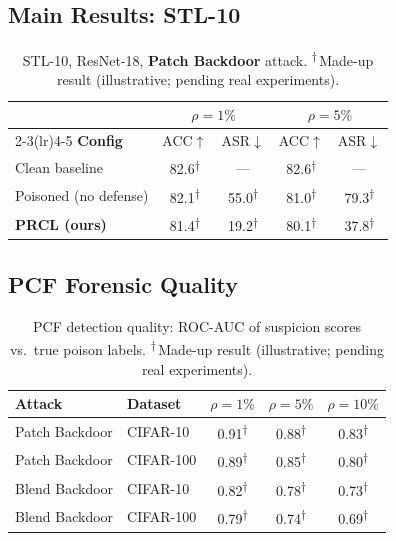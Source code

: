 \documentclass[11pt,a4paper]{article}
\newcommand{\madeupresult}[1]{\textcolor{madeup}{#1\textsuperscript{$\dagger$}}}
\newcommand{\daggernote}{\textsuperscript{$\dagger$}\,\textcolor{madeup}{Made-up result (illustrative; pending real experiments).}}
\begin{document}
\subsection{Main Results: STL-10}

\begin{table}[h]
\centering
\caption{STL-10, ResNet-18, \textbf{Patch Backdoor} attack. \daggernote}
\label{tab:stl10}
\begin{tabular}{@{}l cc cc@{}}
\toprule
& \multicolumn{2}{c}{$\rho=1\%$}
& \multicolumn{2}{c}{$\rho=5\%$} \\
\cmidrule(lr){2-3}\cmidrule(lr){4-5}
\textbf{Config}
& ACC$\uparrow$ & ASR$\downarrow$
& ACC$\uparrow$ & ASR$\downarrow$ \\
\midrule
Clean baseline
  & \madeupresult{82.6} & ---
  & \madeupresult{82.6} & --- \\
Poisoned (no defense)
  & \madeupresult{82.1} & \madeupresult{55.0}
  & \madeupresult{81.0} & \madeupresult{79.3} \\
\textbf{PRCL (ours)}
  & \madeupresult{81.4} & \madeupresult{19.2}
  & \madeupresult{80.1} & \madeupresult{37.8} \\
\bottomrule
\end{tabular}
\end{table}


\subsection{PCF Forensic Quality}

\begin{table}[h]
\centering
\caption{PCF detection quality: ROC-AUC of suspicion scores vs.\ true poison labels. \daggernote}
\label{tab:pcf_auc}
\begin{tabular}{@{}llccc@{}}
\toprule
\textbf{Attack} & \textbf{Dataset}
& $\rho=1\%$ & $\rho=5\%$ & $\rho=10\%$ \\
\midrule
Patch Backdoor & CIFAR-10
  & \madeupresult{0.91} & \madeupresult{0.88} & \madeupresult{0.83} \\
Patch Backdoor & CIFAR-100
  & \madeupresult{0.89} & \madeupresult{0.85} & \madeupresult{0.80} \\
Blend Backdoor & CIFAR-10
  & \madeupresult{0.82} & \madeupresult{0.78} & \madeupresult{0.73} \\
Blend Backdoor & CIFAR-100
  & \madeupresult{0.79} & \madeupresult{0.74} & \madeupresult{0.69} \\
\bottomrule
\end{tabular}
\end{table}
\end{document}
